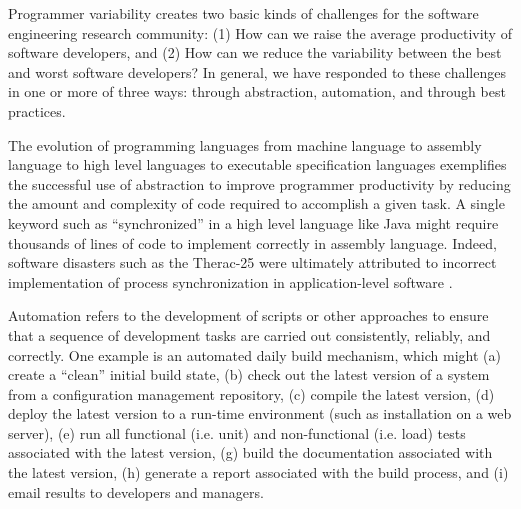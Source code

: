 
Programmer variability creates two basic kinds of challenges for the
software engineering research community: (1) How can we raise the average
productivity of software developers, and (2) How can we reduce the
variability between the best and worst software developers?  In general, we
have responded to these challenges in one or more of three ways: through
abstraction, automation, and through best practices.

The evolution of programming languages from machine language to assembly
language to high level languages to executable specification languages
exemplifies the successful use of abstraction to improve programmer
productivity by reducing the amount and complexity of code required to
accomplish a given task.  A single keyword such as ``synchronized'' in a
high level language like Java might require thousands of lines of code to
implement correctly in assembly language.  Indeed, software disasters such
as the Therac-25 were ultimately attributed to incorrect implementation of
process synchronization in application-level software \cite{Leveson93}.

Automation refers to the development of scripts or other approaches to
ensure that a sequence of development tasks are carried out consistently,
reliably, and correctly.  One example is an automated daily build
mechanism, which might (a) create a ``clean'' initial build state, (b)
check out the latest version of a system from a configuration management
repository, (c) compile the latest version, (d) deploy the latest version
to a run-time environment (such as installation on a web server), (e) run
all functional (i.e. unit) and non-functional (i.e. load) tests associated
with the latest version, (g) build the documentation associated with the
latest version, (h) generate a report associated with the build process,
and (i) email results to developers and managers.  


